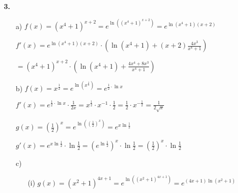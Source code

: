 \documentclass[a4paper,11pt]{scrartcl}
\newcommand{\bra}[1]{\left(#1\right)}
\begin{document}
\begin{enumerate}
        \begin{center}\end{center}

    \item[\textbf{3.}]
    \begin{enumerate}
        \item[a)]
            \( f(x) = (x^4 + 1)^{x+2} = e^{\ln\bra{(x^4 + 1)^{x+2}}} = e^{\ln\bra{x^4 + 1} (x + 2)} \)

            \( f'(x) = e^{\ln\bra{x^4 + 1} (x + 2)} \cdot \bra{\ln\bra{x^4+1} + (x+2)\frac{4x^3}{x^4+1}} \)

            \( =  (x^4 + 1)^{x+2} \cdot \bra{\ln\bra{x^4+1} + \frac{4x^4 + 8x^3}{x^4+1}} \)

        \item[b)]
            \( f(x) = x^{\frac{1}{2}} = e^{\ln\bra{x^{\frac{1}{2}}}} = e^{\frac{1}{2} \cdot \ln x} \)

            \( f'(x) = e^{\frac{1}{2} \cdot \ln x} \cdot \frac{1}{2x} = x^{\frac{1}{2}} \cdot x^{-1} \cdot \frac{1}{2} =
            \frac{1}{2} \cdot x^{-\frac{1}{2}} = \frac{1}{2 \sqrt{x}} \)

            \( g(x) = \bra{\frac{1}{2}}^x = e^{\ln\bra{\bra{\frac{1}{2}}^x}} = e^{x \ln\frac{1}{2}} \)

            \( g'(x) = e^{x \ln\frac{1}{2}} \cdot \ln\frac{1}{2} = \bra{e^{\ln\frac{1}{2}}}^x \cdot \ln\frac{1}{2} =  \bra{\frac{1}{2}}^x \cdot \ln \frac{1}{2} \)

        \item[c)]
        \begin{enumerate}
            \item[(i)]
                \( g(x) = \bra{x^2 + 1}^{4x + 1} = e^{\ln\bra{(x^2+1)^{4x+1}}} = e^{(4x + 1) \ln\bra{x^2 + 1}} \)


\end{enumerate}
\end{enumerate}
\end{enumerate}
\end{document}
